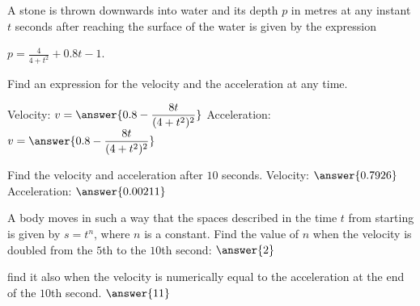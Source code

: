\documentclass{ximera}
\begin{document}
\begin{problem}
A stone is thrown downwards into water and its depth $p$ in metres at any instant $t$ seconds after
reaching the surface of the water is given by the
expression

$p = \frac{4}{4+t^2} + 0.8t - 1$.


Find an expression for the velocity and the acceleration at any time.

Velocity: $v = \answer{0.8 - \dfrac{8t}{(4 + t^2)^2}}$
Acceleration: $v = \answer{0.8 - \dfrac{8t}{(4 + t^2)^2}}$
\begin{problem}
Find the velocity and acceleration after $10$ seconds.
Velocity: $\answer{0.7926}$
Acceleration: $\answer{0.00211}$
\end{problem}
\end{problem}

\begin{problem}
A body moves in such a way that the spaces
described in the time $t$ from starting is given by
$s = t^n$, where $n$ is a constant. Find the value of $n$ when the velocity is doubled from the $5$th to the $10$th second: $\answer{2}$
\begin{problem}
find it also when the velocity is numerically
equal to the acceleration at the end of the $10$th second. $\answer{11}$
\end{problem}
\end{problem}
\end{document}
